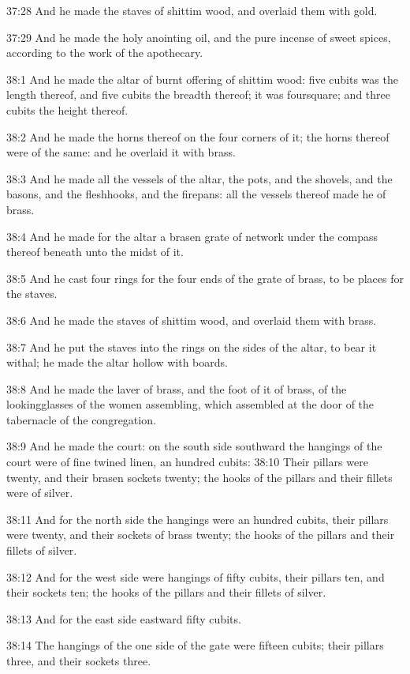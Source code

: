 37:28 And he made the staves of shittim wood, and overlaid them with gold.

37:29 And he made the holy anointing oil, and the pure incense of sweet spices, according to the work of the apothecary.

38:1 And he made the altar of burnt offering of shittim wood: five cubits was the length thereof, and five cubits the breadth thereof; it was foursquare; and three cubits the height thereof.

38:2 And he made the horns thereof on the four corners of it; the horns thereof were of the same: and he overlaid it with brass.

38:3 And he made all the vessels of the altar, the pots, and the shovels, and the basons, and the fleshhooks, and the firepans: all the vessels thereof made he of brass.

38:4 And he made for the altar a brasen grate of network under the compass thereof beneath unto the midst of it.

38:5 And he cast four rings for the four ends of the grate of brass, to be places for the staves.

38:6 And he made the staves of shittim wood, and overlaid them with brass.

38:7 And he put the staves into the rings on the sides of the altar, to bear it withal; he made the altar hollow with boards.

38:8 And he made the laver of brass, and the foot of it of brass, of the lookingglasses of the women assembling, which assembled at the door of the tabernacle of the congregation.

38:9 And he made the court: on the south side southward the hangings of the court were of fine twined linen, an hundred cubits: 38:10 Their pillars were twenty, and their brasen sockets twenty; the hooks of the pillars and their fillets were of silver.

38:11 And for the north side the hangings were an hundred cubits, their pillars were twenty, and their sockets of brass twenty; the hooks of the pillars and their fillets of silver.

38:12 And for the west side were hangings of fifty cubits, their pillars ten, and their sockets ten; the hooks of the pillars and their fillets of silver.

38:13 And for the east side eastward fifty cubits.

38:14 The hangings of the one side of the gate were fifteen cubits; their pillars three, and their sockets three.

